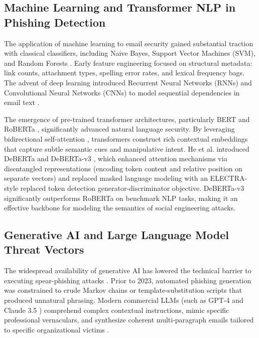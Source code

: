\documentclass[journal]{IEEEtran}
\begin{document}
\subsection{Machine Learning and Transformer NLP in Phishing Detection}
The application of machine learning to email security gained substantial traction with classical classifiers, including Naive Bayes, Support Vector Machines (SVM), and Random Forests \cite{pedregosa2011scikit, salloum2022}. Early feature engineering focused on structural metadata: link counts, attachment types, spelling error rates, and lexical frequency bags. The advent of deep learning introduced Recurrent Neural Networks (RNNs) and Convolutional Neural Networks (CNNs) to model sequential dependencies in email text \cite{roumeliotis2024}.

The emergence of pre-trained transformer architectures, particularly BERT \cite{devlin2019bert} and RoBERTa \cite{liu2019roberta}, significantly advanced natural language security. By leveraging bidirectional self-attention \cite{vaswani2017attention}, transformers construct rich contextual embeddings that capture subtle semantic cues and manipulative intent. He et al. introduced DeBERTa \cite{he2021deberta} and DeBERTa-v3 \cite{he2023debertav3}, which enhanced attention mechanisms via disentangled representations (encoding token content and relative position on separate vectors) and replaced masked language modeling with an ELECTRA-style replaced token detection generator-discriminator objective. DeBERTa-v3 significantly outperforms RoBERTa on benchmark NLP tasks, making it an effective backbone for modeling the semantics of social engineering attacks.

\subsection{Generative AI and Large Language Model Threat Vectors}
The widespread availability of generative AI has lowered the technical barrier to executing spear-phishing attacks \cite{hazell2023large, roy2024}. Prior to 2023, automated phishing generation was constrained to crude Markov chains or template-substitution scripts that produced unnatural phrasing. Modern commercial LLMs (such as GPT-4 \cite{openai2023gpt4} and Claude 3.5 \cite{anthropic2024claude}) comprehend complex contextual instructions, mimic specific professional vernaculars, and synthesize coherent multi-paragraph emails tailored to specific organizational victims \cite{afane2024, chataut2024}.
\end{document}
